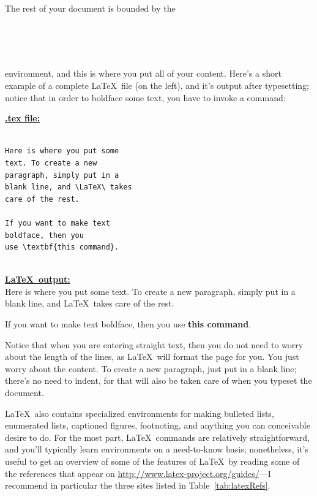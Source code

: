 The rest of your document is bounded by the 
\begin{verbatim}


	
\end{verbatim}	
environment, and this is where you put all of your content. Here's a short example of a complete
\LaTeX\ file (on the left), and it's output after typesetting; notice that in order to boldface some text, 
you have to invoke a command:\\[0.5cm]

\begin{adjustwidth}{-.5cm}{.55\textwidth}
\hspace*{.5cm}\textbf{\underline{.tex file:}}\\
\begin{verbatim}

Here is where you put some
text. To create a new 
paragraph, simply put in a 
blank line, and \LaTeX\ takes
care of the rest.

If you want to make text 
boldface, then you 
use \textbf{this command}.	
	
\end{verbatim}	
\end{adjustwidth}
\vspace*{-5.7cm}
\begin{adjustwidth}{.55\textwidth}{0cm}
\textbf{\underline{\LaTeX\ output:}}\\[1cm]
Here is where you put some text. To create a new paragraph, 
simply put in a blank line, and \LaTeX\ takes
care of the rest.

If you want to make text boldface, then you 
use \textbf{this command}.	
\end{adjustwidth}
\vspace*{1in}


Notice that when you are entering straight text, then you do not need to worry about the length of the lines, as \LaTeX\ will format the page for you. You just worry about the content. To create a new paragraph, just put in a blank line; there's no need to indent, for that will also be taken care of when you typeset the document. 

\LaTeX\ also contains specialized environments for making bulleted lists, enumerated lists, captioned figures, footnoting, and anything you can conceivable desire to do. For the most part, \LaTeX\ commands are relatively straightforward, and you'll typically learn environments on a need-to-know basis; nonetheless, it's useful to get an overview of some of the features of \LaTeX\ by reading some of the references that appear on
\href{http://www.latex-project.org/guides/}{http://www.latex-project.org/guides/}---I recommend in particular the three sites listed in Table~\ref{tab:latexRefs}.\\

